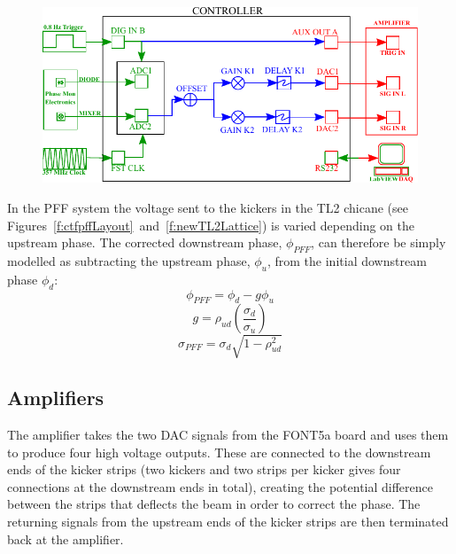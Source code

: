 \documentclass[%
 reprint,
 superscriptaddress,
 amsmath,
 amssymb,
 prstab,
]{revtex4-1}
\begin{document}

\begin{figure}
	\includegraphics[width=\columnwidth]{figs/hw/fontDiagram}%
	\caption{\label{f:fontDiagram}
	}
\end{figure}

In the PFF system the voltage sent to the kickers in the TL2 chicane (see 
Figures~\ref{f:ctfpffLayout}~and~\ref{f:newTL2Lattice}) is varied depending on 
the upstream phase. The corrected downstream phase, \(\phi_{PFF}\), can 
therefore be simply modelled as subtracting the upstream phase, \(\phi_u\), 
from the initial downstream phase \(\phi_d\):
\begin{equation}
\phi_{PFF} = \phi_d - g\phi_u
\label{e:pffEq1}
\end{equation}
\begin{equation}
g = \rho_{ud}\left(\frac{\sigma_d}{\sigma_u}\right)
\label{e:theoretOptGain}
\end{equation}
\begin{equation}
\sigma_{PFF} = \sigma_d\sqrt{1-\rho_{ud}^2}
\end{equation}


\subsection{\label{ss:amp}Amplifiers}

The amplifier takes the two DAC signals from the FONT5a board and
uses them to produce four high voltage outputs. These are connected to the 
downstream ends of the kicker strips (two kickers and two strips per kicker 
gives four connections at the downstream ends in total), creating the potential 
difference between the strips that deflects the beam in order to correct the 
phase. The returning signals from the upstream ends of the kicker strips are 
then terminated back at the amplifier.
\end{document}
